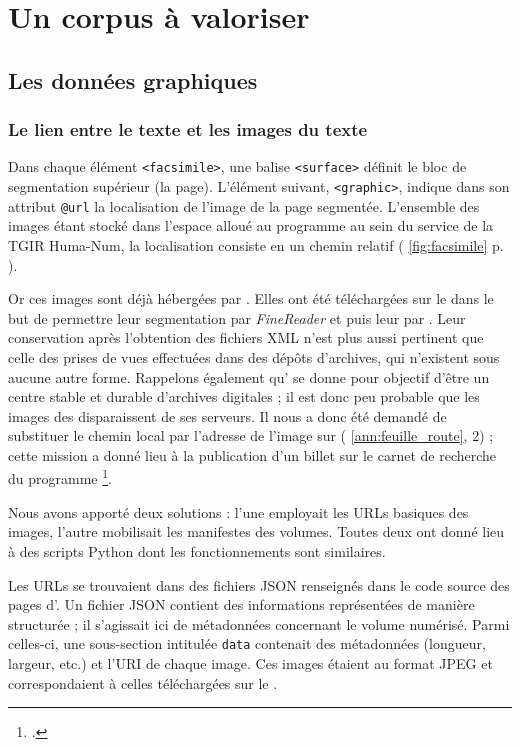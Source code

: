\part{Un corpus à valoriser}

\clearpage
\thispagestyle{empty}
\cleardoublepage

\chapter{Les données graphiques}

\section{Le lien entre le texte et les images du texte}

Dans chaque élément \texttt{<facsimile>}, une balise \texttt{<surface>} définit le bloc de segmentation supérieur (la page). L'élément suivant, \texttt{<graphic>}, indique dans son attribut \texttt{@url} la localisation de l'image de la page segmentée. L'ensemble des images étant stocké dans l'espace alloué au programme \timeus{} au sein du service \sharedocs{} de la TGIR Huma-Num, la localisation consiste en un chemin relatif (\fig{} \ref{fig:facsimile} p. \pageref{fig:facsimile}).

Or ces images sont déjà hébergées par \ia. Elles ont été téléchargées sur le \sharedocs{} dans le but de permettre leur segmentation par \textit{FineReader} et \transkribus{} puis leur \ocr{} par \lse. Leur conservation après l'obtention des fichiers XML n'est plus aussi pertinent que celle des prises de vues effectuées dans des dépôts d'archives, qui n'existent sous aucune autre forme. Rappelons également qu'\ia{} se donne pour objectif d’être un centre stable et durable d’archives digitales ; il est donc peu probable que les images des \odm{} disparaissent de ses serveurs. Il nous a donc été demandé de substituer le chemin local par l'adresse de l'image sur \ia{} (\ann{} \ref{ann:feuille_route}, \issue{} 2) ; cette mission a donné lieu à la publication d'un billet sur le carnet de recherche du programme \timeus\footcite{genero}.

Nous avons apporté deux solutions : l'une employait les URLs basiques des images, l'autre mobilisait les manifestes \iiif{} des volumes. Toutes deux ont donné lieu à des scripts Python dont les fonctionnements sont similaires.

Les URLs se trouvaient dans des fichiers JSON renseignés dans le code source des pages d'\ia. Un fichier JSON contient des informations représentées de manière structurée ; il s'agissait ici de métadonnées concernant le volume numérisé. Parmi celles-ci, une sous-section intitulée \texttt{data} contenait des métadonnées (longueur, largeur, etc.) et l'URI de chaque image. Ces images étaient au format JPEG et correspondaient à celles téléchargées sur le \sharedocs.

